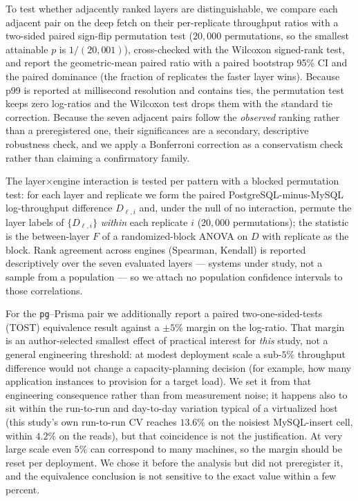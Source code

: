 \documentclass[11pt,a4paper]{article}
\begin{document}
To test whether adjacently ranked layers are distinguishable, we compare each adjacent pair
on the deep fetch on their per-replicate throughput ratios with a two-sided paired
sign-flip permutation test ($20{,}000$ permutations, so the smallest attainable $p$ is
$1/(20{,}001)$), cross-checked with the Wilcoxon signed-rank test, and report the
geometric-mean paired ratio with a paired bootstrap 95\% CI and the paired dominance (the
fraction of replicates the faster layer wins). Because p99 is reported at millisecond
resolution and contains ties, the permutation test keeps zero log-ratios and the Wilcoxon
test drops them with the standard tie correction. Because the seven adjacent pairs follow
the \emph{observed} ranking rather than a preregistered one, their significances are a
secondary, descriptive robustness check, and we apply a Bonferroni correction as a
conservatism check rather than claiming a confirmatory family.

The layer$\times$engine interaction is tested per pattern with a blocked permutation test:
for each layer and replicate we form the paired PostgreSQL-minus-MySQL log-throughput
difference $D_{\ell,i}$ and, under the null of no interaction, permute the layer labels of
$\{D_{\ell,i}\}$ \emph{within} each replicate $i$ ($20{,}000$ permutations); the statistic
is the between-layer $F$ of a randomized-block ANOVA on $D$ with replicate as the block.
Rank agreement across engines (Spearman, Kendall) is reported descriptively over the seven
evaluated layers --- systems under study, not a sample from a population --- so we attach no
population confidence intervals to those correlations.

For the \texttt{pg}--Prisma pair we additionally report a paired two-one-sided-tests (TOST)
equivalence result against a $\pm5\%$ margin on the log-ratio. That margin is an
author-selected smallest effect of practical interest for \emph{this} study, not a general
engineering threshold: at modest deployment scale a sub-$5\%$ throughput difference would
not change a capacity-planning decision (for example, how many application instances to
provision for a target load). We set it from that engineering consequence rather than from
measurement noise; it happens also to sit within the run-to-run and day-to-day variation
typical of a virtualized host (this study's own run-to-run CV reaches $13.6\%$ on the
noisiest MySQL-insert cell, within $4.2\%$ on the reads), but that coincidence is not the
justification. At very large scale even $5\%$ can correspond to many machines, so the margin
should be reset per deployment. We chose it before the analysis but did not preregister it,
and the equivalence conclusion is not sensitive to the exact value within a few percent.
\end{document}
